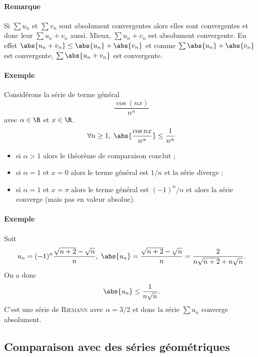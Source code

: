 
\paragraph{Remarque}Si $\sum u_n$ et $\sum v_n$ sont absolument convergentes alors elles sont convergentes et donc leur $\sum u_n+v_n$ aussi. Mieux, $\sum u_n+v_n$ est absolument convergente. En effet $\abs{u_n + v_n}\leq \abs{u_n} + \abs{v_n}$ et comme $\sum \abs{u_n} + \abs{v_n}$ est convergente, $\sum \abs{u_n + v_n}$ est convergente.

\paragraph{Exemple}Considérons la série de terme général \[ \frac{\cos(nx)}{n^{\alpha}}\]avec $\alpha\in \R$ et $x\in \R$.
\begin{align*}
\forall n\geq 1, \; \abs{\frac{\cos nx}{n^{\alpha}}}\leq \frac{1}{n^{\alpha}}
\end{align*}
\begin{itemize}
\item si $\alpha>1$ alors le théorème de comparaison conclut ;
\item si $\alpha=1$ et $x=0$ alors le terme général est $1/n$ et la série diverge ;
\item si $\alpha=1$ et $x = \pi$ alors le terme général est $(-1)^{n}/n$ et alors la série converge (mais pas en valeur absolue).
\end{itemize}

\paragraph{Exemple}Soit \[ u_n = (-1)^{n}\frac{\sqrt{n+2} - \sqrt{n}}{n}, \; \abs{u_n} = \frac{\sqrt{n+2}-\sqrt{n}}{n} = \frac{2}{n\sqrt{n+2} + n\sqrt{n}}.\]On a donc \[\abs{u_n} \leq \frac{1}{n\sqrt{n}}. \]C'est une série de \textsc{Riemann} avec $\alpha = 3/2$ et donc la série $\sum u_n$ converge absolument.

\subsection{Comparaison avec des séries géométriques}

